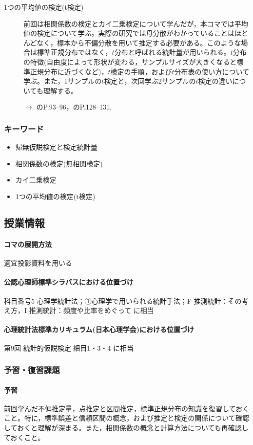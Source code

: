\begin{description}
	\item[1つの平均値の検定(t検定)] 前回は相関係数の検定とカイ二乗検定について学んだが，本コマでは平均値の検定について学ぶ。実際の研究では母分散がわかっていることはほとんどなく，標本から不偏分散を用いて推定する必要がある。このような場合は標準正規分布ではなく，$t$分布と呼ばれる統計量が用いられる。$t$分布の特徴(自由度によって形状が変わる，サンプルサイズが大きくなると標準正規分布に近づくなど)，$t$検定の手順，および$t$分布表の使い方について学ぶ。また，1サンプルの$t$検定と，次回学ぶ2サンプルの$t$検定の違いについても理解する。
	      \begin{flushright}
		      $\to$ \textcite{Kawabata201408}のP.93--96，\textcite{Yamada2004}のP.128--131.
	      \end{flushright}
\end{description}
\subsubsection{キーワード}
\begin{itemize}
	\item 帰無仮説検定と検定統計量
	\item 相関係数の検定(無相関検定)
	\item カイ二乗検定
	\item 1つの平均値の検定(t検定)
\end{itemize}
\subsection{授業情報}
\paragraph{コマの展開方法}
適宜投影資料を用いる
\paragraph{公認心理師標準シラバスにおける位置づけ}
科目番号5 心理学統計法；①心理学で用いられる統計手法；F 推測統計：その考え方，I 推測統計：頻度や比率をめぐって に相当
\paragraph{心理統計法標準カリキュラム(日本心理学会)における位置づけ}
第9回 統計的仮説検定 細目1・3・4 に相当
\subsubsection{予習・復習課題}
\paragraph{予習}
前回学んだ不偏推定量，点推定と区間推定，標準正規分布の知識を復習しておくこと。特に，標準誤差と信頼区間の概念，および推定と検定の関係について確認しておくと理解が深まる。また，相関係数の概念と計算方法についても再確認しておくこと。
